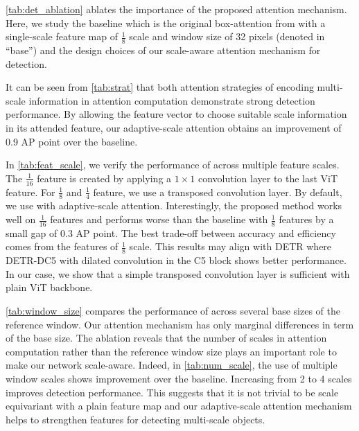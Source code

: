      \cref{tab:det_ablation} ablates the importance of the proposed attention mechanism. Here, we study the baseline which is the original box-attention from \citep{nguyen2022boxer} with a single-scale feature map of $\frac{1}{8}$ scale and window size of 32 pixels (denoted in ``base'') and the design choices of our scale-aware attention mechanism for detection.
    
    It can be seen from \cref{tab:strat} that both attention strategies of encoding multi-scale information in attention computation demonstrate strong detection performance. By allowing the feature vector to choose suitable scale information in its attended feature, our adaptive-scale attention obtains an improvement of 0.9 AP point over the baseline.
    
    In \cref{tab:feat_scale}, we verify the performance of \ours across multiple feature scales. The $\frac{1}{16}$ feature is created by applying a $1\times1$ convolution layer to the last ViT feature. For $\frac{1}{8}$ and $\frac{1}{4}$ feature, we use a transposed convolution layer. By default, we use \ours with adaptive-scale attention. Interestingly, the proposed method works well on $\frac{1}{16}$ features and performs worse than the baseline with $\frac{1}{8}$ features by a small gap of 0.3 AP point. The best trade-off between accuracy and efficiency comes from the features of $\frac{1}{8}$ scale. This results may align with DETR \citep{nicolas2020detr} where DETR-DC5 with dilated convolution in the C5 block shows better performance. In our case, we show that a simple transposed convolution layer is sufficient with plain ViT backbone.
    
    \cref{tab:window_size} compares the performance of \ours across several base sizes of the reference window. Our attention mechanism has only marginal differences in term of the base size. The ablation reveals that the number of scales in attention computation rather than the reference window size plays an important role to make our network scale-aware. Indeed, in \cref{tab:num_scale}, the use of multiple window scales shows improvement over the baseline. Increasing from 2 to 4 scales improves detection performance. This suggests that it is not trivial to be scale equivariant with a plain feature map and our adaptive-scale attention mechanism helps to strengthen features for detecting multi-scale objects.
    
    
